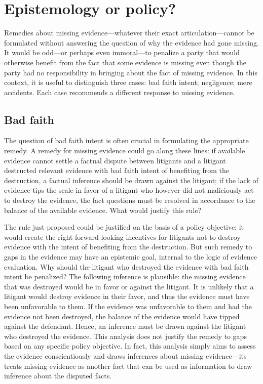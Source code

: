\documentclass[
  10pt,
  dvipsnames,enabledeprecatedfontcommands]{scrartcl}
\begin{document}
\hypertarget{epistemology-or-policy}{%
\section{Epistemology or policy?}\label{epistemology-or-policy}}

\label{sec:remedies} Remedies about missing evidence---whatever their
exact articulation---cannot be formulated without answering the question
of why the evidence had gone missing. It would be odd---or perhaps even
immoral---to penalize a party that would otherwise benefit from the fact
that some evidence is missing even though the party had no
responsibility in bringing about the fact of missing evidence. In this
context, it is useful to distinguish three cases: bad faith intent;
negligence; mere accidents. Each case recommends a different response to
missing evidence.

\hypertarget{bad-faith}{%
\subsection{Bad faith}\label{bad-faith}}

The question of bad faith intent is often crucial in formulating the
appropriate remedy. A remedy for missing evidence could go along these
lines: if available evidence cannot settle a factual dispute between
litigants and a litigant destructed relevant evidence with bad faith
intent of benefiting from the destruction, a factual inference should be
drawn against the litigant; if the lack of evidence tips the scale in
favor of a litigant who however did not maliciously act to destroy the
evidence, the fact questions must be resolved in accordance to the
balance of the available evidence. What would justify this rule?

The rule just proposed could be justified on the basis of a policy
objective: it would create the right forward-looking incentives for
litigants not to destroy evidence with the intent of benefiting from the
destruction. But such remedy to gaps in the evidence may have an
epistemic goal, internal to the logic of evidence evaluation. Why should
the litigant who destroyed the evidence with bad faith intent be
penalized? The following inference is plausible: the missing evidence
that was destroyed would be in favor or against the litigant. It is
unlikely that a litigant would destroy evidence in their favor, and thus
the evidence must have been unfavorable to them. If the evidence was
unfavorable to them and had the evidence not been destroyed, the balance
of the evidence would have tipped against the defendant. Hence, an
inference must be drawn against the litigant who destroyed the evidence.
This analysis does not justify the remedy to gaps based on any specific
policy objective. In fact, this analysis simply aims to assess the
evidence conscientiously and draws inferences about missing
evidence---its treats missing evidence as another fact that can be used
as information to draw inference about the disputed facts.
\end{document}
